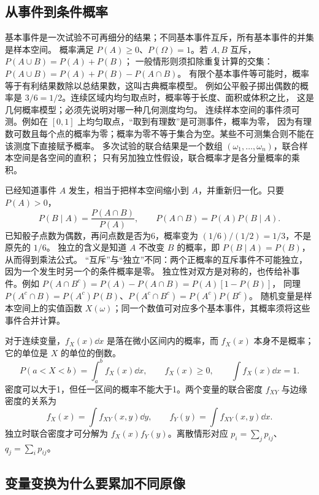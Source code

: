 \subsection{从事件到条件概率}

基本事件是一次试验不可再细分的结果；不同基本事件互斥，所有基本事件的并集是样本空间。
概率满足 $P(A)\ge0$、$P(\Omega)=1$。若 $A,B$ 互斥，$P(A\cup B)=P(A)+P(B)$；
一般情形则须扣除重复计算的交集：$P(A\cup B)=P(A)+P(B)-P(A\cap B)$。
有限个基本事件等可能时，概率等于有利结果数除以总结果数，这叫古典概率模型。
例如公平骰子掷出偶数的概率是 $3/6=1/2$。连续区域内均匀取点时，概率等于长度、面积或体积之比，
这是几何概率模型；必须先说明对哪一种几何测度均匀。
连续样本空间的事件须可测。例如在 $[0,1]$ 上均匀取点，“取到有理数”是可测事件，概率为零，
因为有理数可数且每个点的概率为零；概率为零不等于集合为空。某些不可测集合则不能在该测度下直接赋予概率。
多次试验的联合结果是一个数组 $(\omega_1,\ldots,\omega_n)$，联合样本空间是各空间的直积；
只有另加独立性假设，联合概率才是各分量概率的乘积。

已经知道事件 $A$ 发生，相当于把样本空间缩小到 $A$，并重新归一化。只要 $P(A)>0$，
\begin{equation}
 P(B\mid A)=\frac{P(A\cap B)}{P(A)},\qquad
 P(A\cap B)=P(A)P(B\mid A).
\end{equation}
已知骰子点数为偶数，再问点数是否为6，概率变为 $(1/6)/(1/2)=1/3$，不是原先的 $1/6$。
独立的含义是知道 $A$ 不改变 $B$ 的概率，即 $P(B\mid A)=P(B)$，从而得到乘法公式。
“互斥”与“独立”不同：两个正概率的互斥事件不可能独立，因为一个发生时另一个的条件概率是零。
独立性对双方是对称的，也传给补事件。例如
$P(A\cap B^c)=P(A)-P(A\cap B)=P(A)[1-P(B)]$，
同理 $P(A^c\cap B)=P(A^c)P(B)$、$P(A^c\cap B^c)=P(A^c)P(B^c)$。
随机变量是样本空间上的实值函数 $X(\omega)$；同一个数值可对应多个基本事件，其概率须将这些事件合并计算。

对于连续变量，$f_X(x)\dd x$ 是落在微小区间内的概率，而 $f_X(x)$ 本身不是概率；它的单位是 $X$ 的单位的倒数。
\[P(a<X<b)=\int_a^bf_X(x)\dd x,\qquad
f_X(x)\ge0,\qquad\int f_X(x)\dd x=1.\]
密度可以大于1，但任一区间的概率不能大于1。两个变量的联合密度 $f_{XY}$ 与边缘密度的关系为
\[f_X(x)=\int f_{XY}(x,y)\dd y,\qquad
f_Y(y)=\int f_{XY}(x,y)\dd x.\]
独立时联合密度才可分解为 $f_X(x)f_Y(y)$。离散情形对应 $p_i=\sum_jp_{ij}$、$q_j=\sum_ip_{ij}$。

\subsection{变量变换为什么要累加不同原像}

